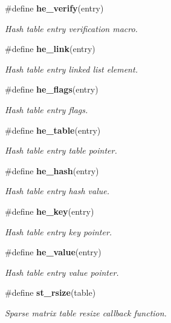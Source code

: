 \begin{CompactItemize}
\#define {\bf he\_\-verify}(entry)
\begin{CompactList}\small\item\em Hash table entry verification macro.\item\end{CompactList}\item 
\#define {\bf he\_\-link}(entry)
\begin{CompactList}\small\item\em Hash table entry linked list element.\item\end{CompactList}\item 
\#define {\bf he\_\-flags}(entry)
\begin{CompactList}\small\item\em Hash table entry flags.\item\end{CompactList}\item 
\#define {\bf he\_\-table}(entry)
\begin{CompactList}\small\item\em Hash table entry table pointer.\item\end{CompactList}\item 
\#define {\bf he\_\-hash}(entry)
\begin{CompactList}\small\item\em Hash table entry hash value.\item\end{CompactList}\item 
\#define {\bf he\_\-key}(entry)
\begin{CompactList}\small\item\em Hash table entry key pointer.\item\end{CompactList}\item 
\#define {\bf he\_\-value}(entry)
\begin{CompactList}\small\item\em Hash table entry value pointer.\item\end{CompactList}\item 
\#define {\bf st\_\-rsize}(table)
\begin{CompactList}\small\item\em Sparse matrix table resize callback function.\item\end{CompactList}\end{CompactItemize}
